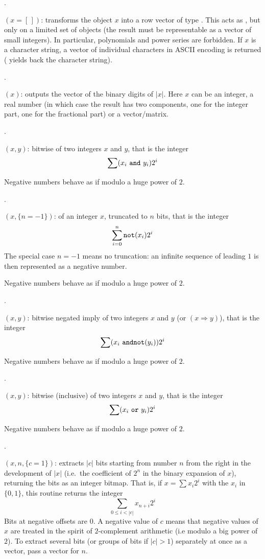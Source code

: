 .

$({x=[\,]})$: transforms the object $x$ into a row
vector of type . This acts as , but only on a
limited set of objects (the result must be representable as a vector of small
integers). In particular, polynomials and power series are forbidden.
If $x$ is a character string, a vector of individual characters in ASCII
encoding is returned ( yields back the character string).

.

$(x)$: outputs the vector of the binary digits of $|x|$.
Here $x$ can be an integer, a real number (in which case the result has two
components, one for the integer part, one for the fractional part) or a
vector/matrix.

.

$(x,y)$: bitwise  of two
integers $x$ and $y$, that is the integer
$$\sum (x_i~{\tt and}~y_i) 2^i$$

Negative numbers behave as if modulo a huge power of $2$.

.

$(x,\{n=-1\})$:  of an integer $x$,
truncated to $n$ bits, that is the integer
$$\sum_{i=0}^n {\tt not}(x_i) 2^i$$
The special case $n=-1$ means no truncation: an infinite sequence of
leading $1$ is then represented as a negative number.

Negative numbers behave as if modulo a huge power of $2$.

.

$(x,y)$: bitwise negated imply of two integers $x$
and $y$ (or  $(x \Rightarrow y)$), that is the integer
$$\sum (x_i~{\tt and not}(y_i)) 2^i$$

Negative numbers behave as if modulo a huge power of $2$.

.

$(x,y)$: bitwise (inclusive)
 of two integers $x$ and $y$, that is the integer
$$\sum (x_i~{\tt or}~y_i) 2^i$$

Negative numbers behave as if modulo a huge power of $2$.

.

$(x,n,\{c=1\})$: extracts $|c|$ bits starting from
number $n$ from the right in the development of $|x|$ (i.e.~the coefficient
of $2^n$ in the binary expansion of $x$), returning the bits as an integer
bitmap. That is, if $x = \sum x_i 2^i$ with the $x_i$ in $\{0,1\}$, this
routine returns the integer
$$ \sum_{0\leq i < |c|} x_{n + i} 2^i $$
Bits at negative offsets are 0. A negative value of $c$ means that negative
values of $x$ are treated in the spirit of $2$-complement arithmetic (i.e
modulo a big power of $2$). To extract several bits (or groups of bits if
$|c|>1$) separately at once as a vector, pass a vector for $n$.

